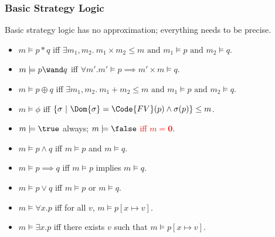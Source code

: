 \begin{frame}[fragile]
    \frametitle{Basic Strategy Logic}

\begin{definition} Basic strategy logic has no approximation; everything needs to be precise.
\end{definition}
\begin{itemize}
    \item $m \models p * q$ iff $\exists m_1, m_2.\ m_1 \times m_2 \leq m \text{ and } m_1 \models p \text{ and } m_2 \models q$.
    \item $m \models p \wand q$ iff $\forall m'. m' \models p  \implies m' \times m \models q$.
    \item $m \models p \oplus q$ iff $\exists m_1, m_2.\ m_1 + m_2 \leq m \text{ and } m_1 \models p \text{ and } m_2 \models q$.
    \item $m \models \phi$ iff $\{\sigma ~|~ \Dom{\sigma} = \Code{FV}(p) \land \sigma(p)\}\leq m$.
    \item $m \models \true$ always; $m \models \false$ \textcolor{red}{iff $m = \mathbf{0}$}.
    \item $m \models p \land q$ iff $m \models p$ and $m \models q$.
    \item $m \models p \implies q$ iff $m \models p$ implies $m \models q$.
    \item $m \models p \lor q$ iff $m \models p$ or $m \models q$.
    \item $m \models \forall x. p$ iff for all $v$, $m \models p[x\mapsto v]$.
    \item $m \models \exists x. p$ iff there exists $v$ such that $m \models p[x\mapsto v]$.
\end{itemize}

\end{frame}


